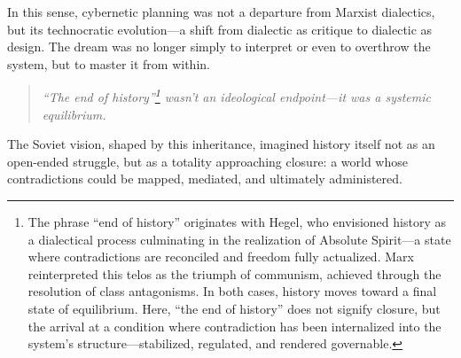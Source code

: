 \begin{tcolorbox}[colback=gray!10, colframe=black, title={Sidebar: From Marxist Dialectics to Soviet Cybernetic Planning}, fonttitle=\bfseries, breakable]
    \medskip
    
    In this sense, cybernetic planning was not a departure from Marxist dialectics, but its technocratic evolution—a shift from dialectic as critique to dialectic as design. The dream was no longer simply to interpret or even to overthrow the system, but to master it from within.
    
    \begin{quote}
        \emph{“The end of history”\footnote{The phrase “end of history” originates with Hegel, who envisioned history as a dialectical process culminating in the realization of Absolute Spirit—a state where contradictions are reconciled and freedom fully actualized. Marx reinterpreted this telos as the triumph of communism, achieved through the resolution of class antagonisms. In both cases, history moves toward a final state of equilibrium. Here, “the end of history” does not signify closure, but the arrival at a condition where contradiction has been internalized into the system’s structure—stabilized, regulated, and rendered governable.} wasn’t an ideological endpoint—it was a systemic equilibrium.}
    \end{quote}
    
    The Soviet vision, shaped by this inheritance, imagined history itself not as an open-ended struggle, but as a totality approaching closure: a world whose contradictions could be mapped, mediated, and ultimately administered.
    
\end{tcolorbox}
    